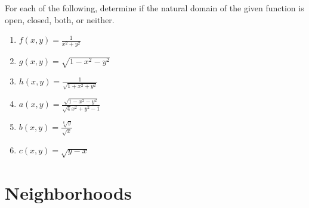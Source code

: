 \documentclass{ximera}
\begin{document}
\begin{problem}

For each of the following, determine if the natural domain of the given function is open, closed, both, or neither.

\begin{enumerate}
\item $f(x,y) = \frac{1}{x^2+y^2}$
\begin{multipleChoice}
\end{multipleChoice}			%
\item $g(x,y) = \sqrt{1-x^2-y^2}$
\begin{multipleChoice}
\end{multipleChoice}			%
\item $h(x,y) = \frac{1}{\sqrt{1+x^2+y^2}}$
\begin{multipleChoice}
\end{multipleChoice}			%
\item $a(x,y) = \frac{\sqrt{1-x^2-y^2}}{\sqrt{4}{x^2+y^2-1}}$
\begin{multipleChoice}
\end{multipleChoice}			%
\item $b(x,y) = \frac{\sqrt[6]{y}}{\sqrt{x}}$
\begin{multipleChoice}
\end{multipleChoice}			%
\item $c(x,y) = \sqrt{y-x}$
\begin{multipleChoice}
\end{multipleChoice}			%
\end{enumerate}

\end{problem}

\section*{Neighborhoods}
\end{document}
